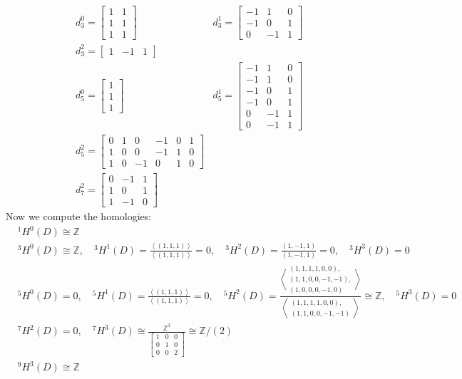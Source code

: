 \documentclass[11pt]{article}
\theoremstyle{definition}
\newcommand{\gen}[1]{\left\langle #1 \right\rangle}
\begin{document}
        \begin{align*}
            &d_3^0 = \begin{bmatrix} 1&1\\1&1\\1&1 \end{bmatrix} &d_3^1 = \begin{bmatrix} -1 & 1 & 0\\ -1 & 0 & 1\\ 0 & -1 & 1 \end{bmatrix}\\
            &d_3^2 = \begin{bmatrix} 1&-1&1 \end{bmatrix}\\
            &d_5^0 = \begin{bmatrix} 1\\1\\1 \end{bmatrix} &d_5^1 =  \begin{bmatrix} -1&1&0\\-1&1&0\\-1&0&1\\-1&0&1\\0&-1&1\\0&-1&1 \end{bmatrix}\\
            &d_5^2 = \begin{bmatrix} 0&1&0&-1&0&1\\1&0&0&-1&1&0\\1&0&-1&0&1&0 \end{bmatrix}\\
            &d_7^2 = \begin{bmatrix}0&-1&1\\1&0&1\\1&-1&0\end{bmatrix}
        \end{align*}
        Now we compute the homologies:
        \begin{align*}
            &{}^1H^0(D) \cong \mathbb{Z} \\
            &{}^3H^0(D) \cong \mathbb{Z}, \quad {}^3H^1(D) = \frac{\gen{(1,1,1)}}{\gen{(1,1,1)}} = 0, \quad {}^3H^2(D) = \frac{(1,-1,1)}{(1,-1,1)} = 0, \quad {}^3H^3(D) = 0 \\
            &{}^5H^0(D) = 0, \quad {}^5H^1(D) = \frac{\gen{(1,1,1)}}{\gen{(1,1,1)}} = 0, \quad {}^5H^2(D) = \frac{\gen{\substack{(1,1,1,1,0,0),\\(1,1,0,0,-1,-1),\\(1,0,0,0,-1,0)}}}{\gen{\substack{(1,1,1,1,0,0),\\(1,1,0,0,-1,-1)}}} \cong \mathbb{Z}, \quad {}^5H^3(D) = 0\\
            &{}^7H^2(D) = 0, \quad {}^7H^3(D) \cong \frac{\mathbb{Z}^3}{\begin{bmatrix} 1&0&0\\0&1&0\\0&0&2 \end{bmatrix}} \cong \mathbb{Z}/(2)\\
            &{}^9H^3(D) \cong \mathbb{Z}
        \end{align*}
\end{document}
